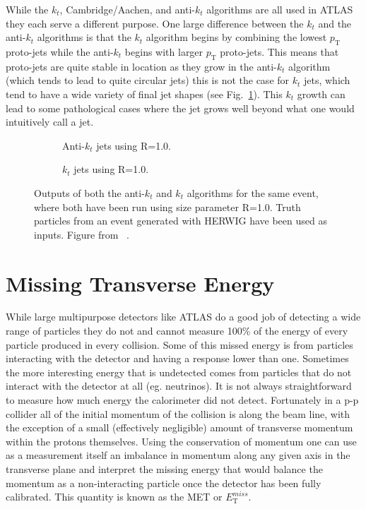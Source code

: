 While the $k_t$, Cambridge/Aachen, and anti-$k_t$ algorithms are all used in ATLAS they each serve a different purpose. 
One large difference between the $k_t$ and the anti-$k_t$ algorithms is that the $k_t$ algorithm begins by combining the lowest $p_{\mathrm T}$ proto-jets while the anti-$k_t$ begins with larger $p_{\mathrm T}$ proto-jets.  
This means that proto-jets are quite stable in location as they grow in the anti-$k_t$ algorithm (which tends to lead to quite circular jets) this is not the case for $k_t$ jets, which tend to have a wide variety of final jet shapes (see Fig.~\ref{Fig:ExampleJets}).  
This $k_t$ growth can lead to some pathological cases where the jet grows well beyond what one would intuitively call a jet.  

\begin{figure}[!ht]
 \centering
 \begin{subfigure}{.5\textwidth}
  \centering
  \caption{Anti-$k_t$ jets using R=1.0.}
 \end{subfigure}%
 \begin{subfigure}{.5\textwidth}
  \centering
  \caption{$k_t$ jets using R=1.0.}
 \end{subfigure}
 \caption[Comparing differnet jet building algorithms.]
  {Outputs of both the anti-$k_t$ and $k_t$ algorithms for the same event, where both have been run using size parameter R=1.0.  Truth particles from an event generated with HERWIG have been used as inputs.  Figure from ~\cite{Cacciari:2008gp}. }
 \label{Fig:ExampleJets}
\end{figure}



\section{Missing Transverse Energy}

While large multipurpose detectors like ATLAS do a good job of detecting a wide range of particles they do not and cannot measure 100\% of the energy of every particle produced in every collision.  
Some of this missed energy is from particles interacting with the detector and having a response lower than one.  
Sometimes the more interesting energy that is undetected comes from particles that do not interact with the detector at all (eg. neutrinos).  
It is not always straightforward to measure how much energy the calorimeter did not detect.  
Fortunately in a p-p collider all of the initial momentum of the collision is along the beam line, with the exception of a small (effectively negligible) amount of transverse momentum within the protons themselves.  
Using the conservation of momentum one can use as a measurement itself an imbalance in momentum along any given axis in the transverse plane and interpret the missing energy that would balance the momentum as a non-interacting particle once the detector has been fully calibrated.  
This quantity is known as the \gls{MET} or $E_{\mathrm T}^{miss}$.  


